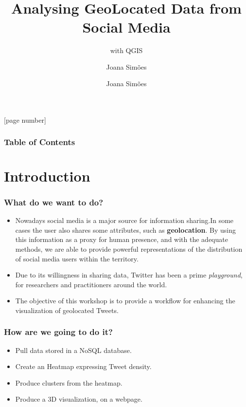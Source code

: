 \documentclass[hyperref={pdfpagelabels=true}]{beamer}
\title{Analysing GeoLocated Data from Social Media}
\subtitle{with QGIS}
\author{Joana Sim\~{o}es}
\author[shortname]{Joana Sim\~{o}es \inst{1}}
\institute[shortinst]{\inst{1} Bdigital, CASA, CICS.NOVA}
\begin{document}
[page number]
\begin{frame}
\titlepage


\end{frame} 
  
 
\begin{frame}
\frametitle{Table of Contents}
\tableofcontents%
\end{frame}

\section{Introduction} 
\begin{frame}
\frametitle{What do we want to do?}

\begin{itemize}
  \item<1->Nowadays social media is a major source for information sharing.In some cases the user also shares some attributes, such as \textbf{geolocation}. By using this information as a proxy for human presence, and with the adequate methods, we are able to provide powerful representations of the distribution of social media users within the territory.
  \item<2->Due to its willingness in sharing data, Twitter has been a prime \textit{playground}, for researchers and practitioners around the world.
  \item<3->The objective of this workshop is to provide a workflow for enhancing the visualization of geolocated Tweets.
  \end{itemize}

\end{frame}

\begin{frame}
\frametitle{How are we going to do it?}

\begin{itemize}
  \item<2->Pull data stored in a NoSQL database.
  \item<3->Create an Heatmap expressing Tweet density.
  \item<4->Produce clusters from the heatmap.
  \item<5->Produce a 3D visualization, on a webpage.  
\end{itemize}

\end{frame}
\end{document}
